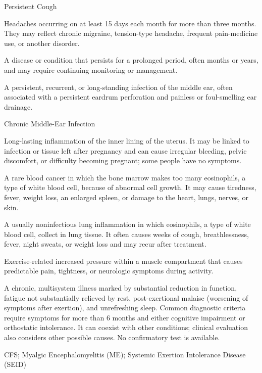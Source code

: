 \synonyms
Persistent Cough

 Headaches occurring on at least 15 days each month for more than three months. They may reflect chronic migraine, tension-type headache, frequent pain-medicine use, or another disorder.

 A disease or condition that persists for a prolonged period, often months or years, and may require continuing monitoring or management.

 A persistent, recurrent, or long-standing infection of the middle ear, often associated with a persistent eardrum perforation and painless or foul-smelling ear drainage.

\synonyms
Chronic Middle-Ear Infection

 Long-lasting inflammation of the inner lining of the uterus. It may be linked to infection or tissue left after pregnancy and can cause irregular bleeding, pelvic discomfort, or difficulty becoming pregnant; some people have no symptoms.

 A rare blood cancer in which the bone marrow makes too many eosinophils, a type of white blood cell, because of abnormal cell growth. It may cause tiredness, fever, weight loss, an enlarged spleen, or damage to the heart, lungs, nerves, or skin.

 A usually noninfectious lung inflammation in which eosinophils, a type of white blood cell, collect in lung tissue. It often causes weeks of cough, breathlessness, fever, night sweats, or weight loss and may recur after treatment.

 Exercise-related increased pressure within a muscle compartment that causes predictable pain, tightness, or neurologic symptoms during activity.

 A chronic, multisystem illness marked by substantial
reduction in function, fatigue not substantially relieved by rest, post-exertional malaise
(worsening of symptoms after exertion), and unrefreshing sleep. Common diagnostic criteria
require symptoms for more than 6 months and either cognitive impairment or orthostatic
intolerance. It can coexist with other conditions; clinical evaluation also considers
other possible causes. No confirmatory test is available.

\synonyms
CFS; Myalgic Encephalomyelitis (ME); Systemic Exertion Intolerance Disease (SEID)

